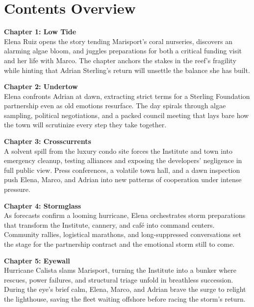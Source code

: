 \chapter*{Contents Overview}

\noindent\textbf{Chapter 1: Low Tide}\\
Elena Ruiz opens the story tending Marisport's coral nurseries, discovers an alarming algae bloom, and juggles preparations for both a critical funding visit and her life with Marco. The chapter anchors the stakes in the reef's fragility while hinting that Adrian Sterling's return will unsettle the balance she has built.

\medskip

\noindent\textbf{Chapter 2: Undertow}\\
Elena confronts Adrian at dawn, extracting strict terms for a Sterling Foundation partnership even as old emotions resurface. The day spirals through algae sampling, political negotiations, and a packed council meeting that lays bare how the town will scrutinize every step they take together.

\medskip

\noindent\textbf{Chapter 3: Crosscurrents}\\
A solvent spill from the luxury condo site forces the Institute and town into emergency cleanup, testing alliances and exposing the developers' negligence in full public view. Press conferences, a volatile town hall, and a dawn inspection push Elena, Marco, and Adrian into new patterns of cooperation under intense pressure.

\medskip

\noindent\textbf{Chapter 4: Stormglass}\\
As forecasts confirm a looming hurricane, Elena orchestrates storm preparations that transform the Institute, cannery, and café into command centers. Community rallies, logistical marathons, and long-suppressed conversations set the stage for the partnership contract and the emotional storm still to come.

\medskip

\noindent\textbf{Chapter 5: Eyewall}\\
Hurricane Calista slams Marisport, turning the Institute into a bunker where rescues, power failures, and structural triage unfold in breathless succession. During the eye's brief calm, Elena, Marco, and Adrian brave the surge to relight the lighthouse, saving the fleet waiting offshore before racing the storm's return.

